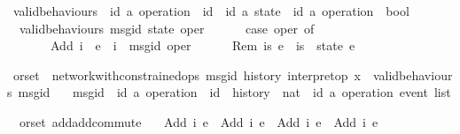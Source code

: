 \begin{isabellebody}
\isamarkupfalse%
\ valid{\isacharunderscore}behaviours\ {\isacharcolon}{\isacharcolon}\ {\isachardoublequoteopen}{\isacharparenleft}{\isacharparenleft}{\isacharprime}id{\isacharcomma}\ {\isacharprime}a{\isacharparenright}\ operation\ {\isasymRightarrow}\ {\isacharprime}id{\isacharparenright}\ {\isasymRightarrow}\ {\isacharparenleft}{\isacharprime}id{\isacharcomma}\ {\isacharprime}a{\isacharparenright}\ state\ {\isasymRightarrow}\ {\isacharparenleft}{\isacharprime}id{\isacharcomma}\ {\isacharprime}a{\isacharparenright}\ operation\ {\isasymRightarrow}\ bool{\isachardoublequoteclose}\ \isanewline
\ \ {\isachardoublequoteopen}valid{\isacharunderscore}behaviours\ msg{\isacharunderscore}id\ state\ oper\ {\isasymequiv}\isanewline
\ \ \ \ \ case\ oper\ of\isanewline
\ \ \ \ \ \ \ Add\ i\ \ e\ {\isasymRightarrow}\ i\ {\isacharequal}\ msg{\isacharunderscore}id\ oper\isanewline
\ \ \ \ \ {\isacharbar}\ Rem\ is\ e\ {\isasymRightarrow}\ is\ {\isacharequal}\ state\ e{\isachardoublequoteclose}\isanewline
\end{isabellebody}

\begin{isabellebody}
\isamarkupfalse%
\ orset\ {\isacharequal}\ network{\isacharunderscore}with{\isacharunderscore}constrained{\isacharunderscore}ops\ msg{\isacharunderscore}id\ history\ interpret{\isacharunderscore}op\ {\isachardoublequoteopen}{\isasymlambda}x{\isachardot}\ {\isacharbraceleft}{\isacharbraceright}{\isachardoublequoteclose}\ {\isachardoublequoteopen}valid{\isacharunderscore}behaviours\ msg{\isacharunderscore}id{\isachardoublequoteclose}\isanewline
\ \ \ msg{\isacharunderscore}id\ {\isacharcolon}{\isacharcolon}\ {\isachardoublequoteopen}{\isacharparenleft}{\isacharprime}id{\isacharcomma}\ {\isacharprime}a{\isacharparenright}\ operation\ {\isasymRightarrow}\ {\isacharprime}id{\isachardoublequoteclose}\ \ history\ {\isacharcolon}{\isacharcolon}\ {\isachardoublequoteopen}nat\ {\isasymRightarrow}\ {\isacharparenleft}{\isacharprime}id{\isacharcomma}\ {\isacharprime}a{\isacharparenright}\ operation\ event\ list{\isachardoublequoteclose}\isanewline
\end{isabellebody}

\begin{isabellebody}
\isamarkupfalse%
\ {\isacharparenleft}\ orset{\isacharparenright}\ add{\isacharunderscore}add{\isacharunderscore}commute{\isacharcolon}\isanewline
\ \ \ {\isachardoublequoteopen}{\isasymlangle}Add\ i{}\ e{}{\isasymrangle}\ {\isasymrhd}\ {\isasymlangle}Add\ i{}\ e{}{\isasymrangle}\ {\isacharequal}\ {\isasymlangle}Add\ i{}\ e{}{\isasymrangle}\ {\isasymrhd}\ {\isasymlangle}Add\ i{}\ e{}{\isasymrangle}{\isachardoublequoteclose}\isanewline
\end{isabellebody}

